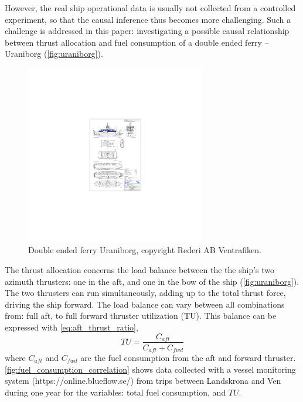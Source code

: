 However, the real ship operational data is usually not collected from a controlled experiment, so that the causal inference thus becomes more challenging. Such a challenge is addressed in this paper: investigating a possible causal relationship between thrust allocation and fuel consumption of a double ended ferry -- Uraniborg (\autoref{fig:uraniborg}).
\begin{figure}[!htb]
    \centering
    \includegraphics[width=0.7\textwidth]{figures/GA_uraniborg.pdf}
    \caption{Double ended ferry Uraniborg, copyright Rederi AB Ventrafiken.}
    \label{fig:uraniborg}
\end{figure}
The thrust allocation concerns the load balance between the the ship's two azimuth thrusters: one in the aft, and one in the bow of the ship (\autoref{fig:uraniborg}). The two thrusters can run simultaneously, adding up to the total thrust force, driving the ship forward. The load balance can vary between all combinations from: full aft, to full forward thruster utilization (TU). This balance can be expressed with \autoref{eq:aft_thrust_ratio},
\begin{equation}
    TU = \frac{C_{aft}}{C_{aft} + C_{fwd}}
    \label{eq:aft_thrust_ratio}
\end{equation}
where $C_{aft}$ and $C_{fwd}$ are the fuel consumption from the aft and forward thruster.
\autoref{fig:fuel_consumption_correlation} shows data collected with a vessel monitoring system (https://online.blueflow.se/) from trips between Landskrona and Ven during one year for the variables: total fuel consumption, and $TU$.
